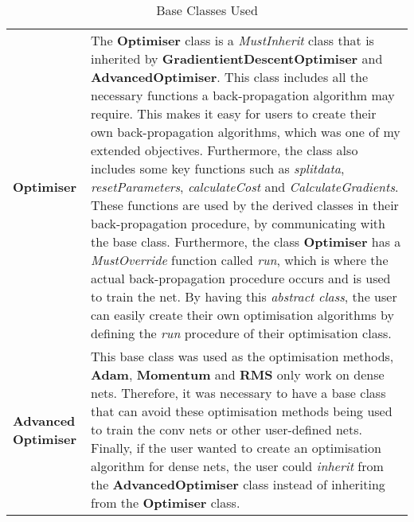 \begin{table}[H]
\begin{tabular}{|p{3cm}|p{13cm}|}
    \textbf{Optimiser} & The \textbf{Optimiser} class is a \textit{MustInherit} class that is inherited by \textbf{GradientientDescentOptimiser} and \textbf{AdvancedOptimiser}. This class includes all the necessary functions a back-propagation algorithm may require. This makes it easy for users to create their own back-propagation algorithms, which was one of my extended objectives. Furthermore, the class also includes some key functions such as \textit{splitdata}, \textit{resetParameters}, \textit{calculateCost} and \textit{CalculateGradients}. These functions are used by the derived classes in their back-propagation procedure, by communicating with the base class. Furthermore, the class \textbf{Optimiser} has a \textit{MustOverride} function called \textit{run}, which is where the actual back-propagation procedure occurs and is used to train the net. By having this \textit{abstract class}, the user can easily create their own optimisation algorithms by defining the \textit{run} procedure of their optimisation class. \\ \cline{1-2}
    \textbf{Advanced Optimiser} & This base class was used as the optimisation methods, \textbf{Adam}, \textbf{Momentum} and \textbf{RMS} only work on dense nets. Therefore, it was necessary to have a base class that can avoid these optimisation methods being used to train the conv nets or other user-defined nets. Finally, if the user wanted to create an optimisation algorithm for dense nets, the user could \textit{inherit} from the \textbf{AdvancedOptimiser} class instead of inheriting from the \textbf{Optimiser} class. \\ \cline{1-2}
    \end{tabular}
    \caption{Base Classes Used}
\end{table}

